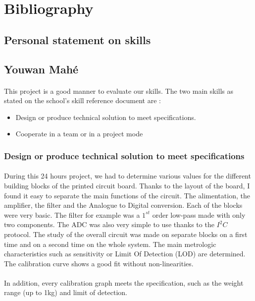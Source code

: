 \documentclass{article}[12pt]
\begin{document}
\section{Bibliography}


\newpage
\begin{appendices}
\section{Personal statement on skills}
\subsection{Youwan Mahé}
\paragraph{}
This project is a good manner to evaluate our skills. The two main skills as stated on the school's skill reference document are :
\begin{itemize}
    \item Design or produce technical solution to meet specifications.
    \item Cooperate in a team or in a project mode
\end{itemize}
\subsubsection{Design or produce technical solution to meet specifications}
\paragraph{} 
During this 24 hours project, we had to determine various values for the different building blocks of the printed circuit board. Thanks to the layout of the board, I found it easy to separate the main functions of the circuit. The alimentation, the amplifier, the filter and the Analogue to Digital conversion. Each of the blocks were very basic. The filter for example was a $1^{st}$ order low-pass made with only two components. The ADC was also very simple to use thanks to the $I^2C$ protocol. The study of the overall circuit was made on separate blocks on a first time and on a second time on the whole system. The main metrologic characteristics such as sensitivity or Limit Of Detection (LOD) are determined. The calibration curve shows a good fit without non-linearities. 
\paragraph{}
In addition, every calibration graph meets the specification, such as the weight range (up to 1kg) and limit of detection.

\end{appendices}
\end{document}
